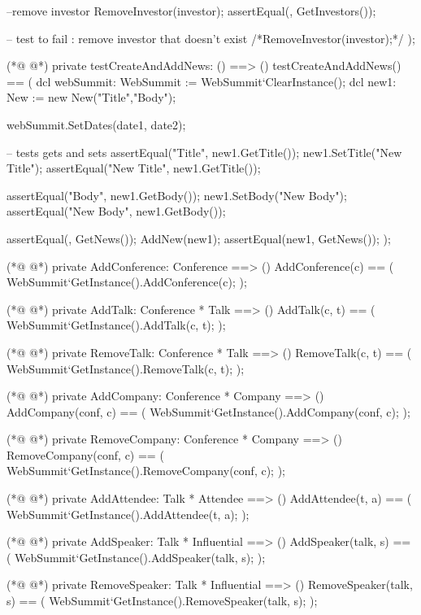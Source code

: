 \begin{vdmpp}[breaklines=true]
  --remove investor
  RemoveInvestor(investor);
  assertEqual({}, GetInvestors());
  
  -- test to fail : remove investor that doesn't exist
  /*RemoveInvestor(investor);*/
 );
 
(*@
\label{testCreateAndAddNews:470}
@*)
 private testCreateAndAddNews: () ==> ()
 testCreateAndAddNews() == (
  dcl webSummit: WebSummit := WebSummit`ClearInstance();
  dcl new1: New := new New("Title","Body");
  
  webSummit.SetDates(date1, date2);
  
  -- tests gets and sets
  assertEqual("Title", new1.GetTitle());
  new1.SetTitle("New Title");
  assertEqual("New Title", new1.GetTitle());  
  
  assertEqual("Body", new1.GetBody());
  new1.SetBody("New Body");
  assertEqual("New Body", new1.GetBody()); 
  
  assertEqual({}, GetNews());
  AddNew(new1);
  assertEqual({new1}, GetNews());
 );
 
(*@
\label{AddConference:491}
@*)
 private AddConference: Conference ==> ()
 AddConference(c) == (
  WebSummit`GetInstance().AddConference(c);
 );
 
(*@
\label{AddTalk:496}
@*)
 private AddTalk: Conference * Talk ==> ()
 AddTalk(c, t) == (
  WebSummit`GetInstance().AddTalk(c, t);
  );
 
(*@
\label{RemoveTalk:501}
@*)
 private RemoveTalk: Conference * Talk ==> ()
 RemoveTalk(c, t) == (
  WebSummit`GetInstance().RemoveTalk(c, t);
 );
 
(*@
\label{AddCompany:506}
@*)
 private AddCompany: Conference * Company ==> ()
 AddCompany(conf, c) == (
  WebSummit`GetInstance().AddCompany(conf, c);
 );
 
(*@
\label{RemoveCompany:511}
@*)
 private RemoveCompany: Conference * Company ==> ()
 RemoveCompany(conf, c) == (
  WebSummit`GetInstance().RemoveCompany(conf, c);
 );
 
(*@
\label{AddAttendee:516}
@*)
 private AddAttendee: Talk * Attendee ==> ()
 AddAttendee(t, a) == (
  WebSummit`GetInstance().AddAttendee(t, a);
 );

(*@
\label{AddSpeaker:521}
@*)
 private AddSpeaker: Talk * Influential ==> ()
 AddSpeaker(talk, s) == (
  WebSummit`GetInstance().AddSpeaker(talk, s);
 );
 
(*@
\label{RemoveSpeaker:526}
@*)
 private RemoveSpeaker: Talk * Influential ==> ()
 RemoveSpeaker(talk, s) == (
  WebSummit`GetInstance().RemoveSpeaker(talk, s);
 ); 
  

\end{vdmpp}
